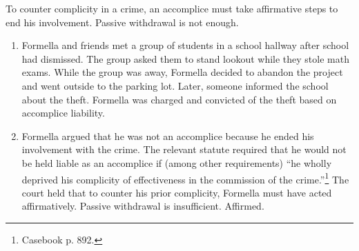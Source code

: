 To counter complicity in a crime, an accomplice must take affirmative steps to 
end his involvement. Passive withdrawal is not enough.

\begin{enumerate}
    \item Formella and friends met a group of students in a school hallway 
    after school had dismissed. The group asked them to stand lookout while 
    they stole math exams. While the group was away, Formella decided to 
    abandon the project and went outside to the parking lot. Later, someone 
    informed the school about the theft. Formella was charged and convicted of 
    the theft based on accomplice liability.
    \item Formella argued that he was not an accomplice because he ended his 
    involvement with the crime. The relevant statute required that he would 
    not be held liable as an accomplice if (among other requirements) ``he 
    wholly deprived his complicity of effectiveness in the commission of the 
    crime.''\footnote{Casebook p. 892.} The court held that to counter his 
    prior complicity, Formella must have acted affirmatively. Passive 
    withdrawal is insufficient. Affirmed.
\end{enumerate}
